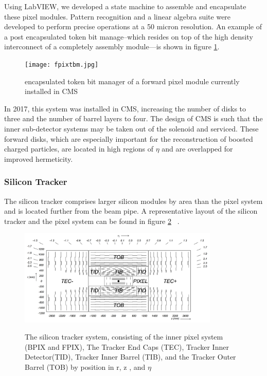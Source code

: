 Using LabVIEW, we developed a state machine to assemble and encapsulate these pixel modules. Pattern recognition and a linear algebra suite were developed to perform precise operations at a 50 micron resolution. An example of a post encapsulated token bit manage--which resides on top of the high density interconnect of a completely assembly module---is shown in figure \ref{fig:tbm}.

\begin{figure}[ht!b]
    \centering
  \texttt{[image: fpixtbm.jpg]}
    \caption{\label{fig:tbm} encapsulated token bit manager of a forward pixel module currently installed in CMS}
\end{figure}


In 2017, this system was installed in CMS, increasing the number of disks to three and the number of barrel layers to four.  The design of CMS is such that the inner sub-detector systems may be taken out of the solenoid and serviced.  
These forward disks, which are especially important for the reconstruction of boosted charged particles, are located in high regions of $\eta$ and are overlapped for improved hermeticity.  


\subsubsection{Silicon Tracker}
The silicon tracker comprises larger silicon modules by area than the pixel system and is located further from the beam pipe. A representative layout of the silicon tracker and the pixel system can be found in figure \ref{fig:tracker} ~\cite{Chatrchyan:2008zzk}. 

\begin{figure}[ht!b]
\label{fig:tracker}
  \centering
  \includegraphics[width=0.85\textwidth]{figures/silicon/SiliconTracker.png}\\
    \caption{ The silicon tracker system, consisting of the inner pixel system (BPIX and FPIX), The Tracker End Caps (TEC), Tracker Inner Detector(TID), Tracker Inner Barrel (TIB), and the Tracker Outer Barrel (TOB) by position in r, z , and $\eta$ ~\cite{Chatrchyan:2008zzk}}
\end{figure}



